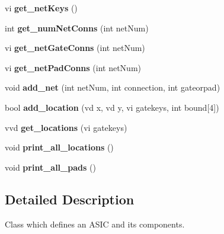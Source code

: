 \begin{DoxyCompactItemize}
\item 
vi {\bfseries get\+\_\+net\+Keys} ()\hypertarget{classmothercore_ad9591a88c1c16bf98bf9ca2714397119}{}\label{classmothercore_ad9591a88c1c16bf98bf9ca2714397119}

\item 
int {\bfseries get\+\_\+num\+Net\+Conns} (int net\+Num)\hypertarget{classmothercore_a3011be859dee0013e29f79abf268aadc}{}\label{classmothercore_a3011be859dee0013e29f79abf268aadc}

\item 
vi {\bfseries get\+\_\+net\+Gate\+Conns} (int net\+Num)\hypertarget{classmothercore_a6f54e96436e2451aaad73a72a19586f4}{}\label{classmothercore_a6f54e96436e2451aaad73a72a19586f4}

\item 
vi {\bfseries get\+\_\+net\+Pad\+Conns} (int net\+Num)\hypertarget{classmothercore_a2259dbb05fb9c58c0ae092d695780beb}{}\label{classmothercore_a2259dbb05fb9c58c0ae092d695780beb}

\item 
void {\bfseries add\+\_\+net} (int net\+Num, int connection, int gateorpad)\hypertarget{classmothercore_a43d5c569faafb37f221a8c40252f4bb0}{}\label{classmothercore_a43d5c569faafb37f221a8c40252f4bb0}

\item 
bool {\bfseries add\+\_\+location} (vd x, vd y, vi gatekeys, int bound\mbox{[}4\mbox{]})\hypertarget{classmothercore_a850753340ba6043464b7a93d6bf58124}{}\label{classmothercore_a850753340ba6043464b7a93d6bf58124}

\item 
vvd {\bfseries get\+\_\+locations} (vi gatekeys)\hypertarget{classmothercore_a7fa5a52e1a1790cd926fad59214c86c3}{}\label{classmothercore_a7fa5a52e1a1790cd926fad59214c86c3}

\item 
void {\bfseries print\+\_\+all\+\_\+locations} ()\hypertarget{classmothercore_a2b0d43404024b9e7cc1486197784464b}{}\label{classmothercore_a2b0d43404024b9e7cc1486197784464b}

\item 
void {\bfseries print\+\_\+all\+\_\+pads} ()\hypertarget{classmothercore_a275771097e3bcdd9bb9ae0f81deec259}{}\label{classmothercore_a275771097e3bcdd9bb9ae0f81deec259}

\end{DoxyCompactItemize}


\subsection{Detailed Description}
Class which defines an A\+S\+IC and its components. 

